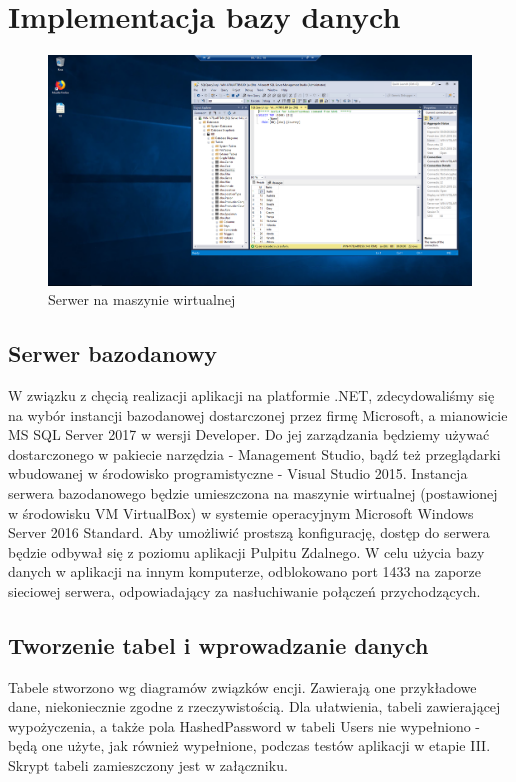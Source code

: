 \documentclass{article}
\begin{document}
\section{Implementacja bazy danych}
\begin{figure}[!ht]
\centering
\includegraphics[width=15cm]{serwer.PNG}
\caption{Serwer na maszynie wirtualnej}
\end{figure}
\subsection{Serwer bazodanowy}
W związku z chęcią realizacji aplikacji na platformie .NET, zdecydowaliśmy się na wybór instancji bazodanowej dostarczonej przez firmę Microsoft, a mianowicie MS SQL Server 2017 w wersji Developer. Do jej zarządzania będziemy używać dostarczonego w pakiecie narzędzia - Management Studio, bądź też przeglądarki wbudowanej w środowisko programistyczne - Visual Studio 2015. Instancja serwera bazodanowego będzie umieszczona na maszynie wirtualnej (postawionej w środowisku VM VirtualBox) w systemie operacyjnym Microsoft Windows Server 2016 Standard. Aby umożliwić prostszą konfigurację, dostęp do serwera będzie odbywał się z poziomu aplikacji Pulpitu Zdalnego. W celu użycia bazy danych w aplikacji na innym komputerze, odblokowano port 1433 na zaporze sieciowej serwera, odpowiadający za nasłuchiwanie połączeń przychodzących.  
\subsection{Tworzenie tabel i wprowadzanie danych}
Tabele stworzono wg diagramów związków encji. Zawierają one przykładowe dane, niekoniecznie zgodne z rzeczywistością. Dla ułatwienia, tabeli zawierającej wypożyczenia, a także pola HashedPassword w tabeli Users nie wypełniono - będą one użyte, jak również wypełnione, podczas testów aplikacji w etapie III. Skrypt tabeli zamieszczony jest w załączniku.
\end{document}
